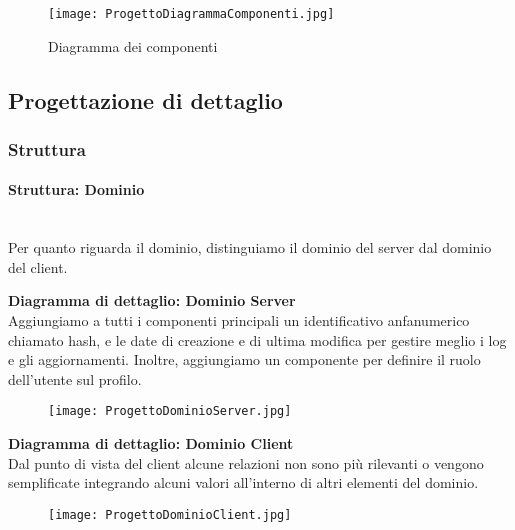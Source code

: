 \newpage

\begin{figure}[h!]
    \begin{center}
        \texttt{[image: ProgettoDiagrammaComponenti.jpg]}
        \caption{Diagramma dei componenti}
    \end{center}
\end{figure}

\newpage

\subsection{Progettazione di dettaglio}

\subsubsection{Struttura}

\paragraph{Struttura: Dominio}\mbox{}\\

Per quanto riguarda il dominio, distinguiamo il dominio del server dal dominio del client.

\vspace{1em}

\textbf{Diagramma di dettaglio: Dominio Server}\\
Aggiungiamo a tutti i componenti principali un identificativo anfanumerico chiamato hash,
e le date di creazione e di ultima modifica per gestire meglio i log e gli aggiornamenti.
Inoltre, aggiungiamo un componente per definire il ruolo dell'utente sul profilo.
\begin{figure}[h!]
    \begin{center}
        \texttt{[image: ProgettoDominioServer.jpg]}
    \end{center}
\end{figure}

\newpage

\textbf{Diagramma di dettaglio: Dominio Client}\\
Dal punto di vista del client alcune relazioni non sono più rilevanti o vengono semplificate integrando alcuni valori all'interno di altri elementi del dominio.
\begin{figure}[h!]
    \begin{center}
        \texttt{[image: ProgettoDominioClient.jpg]}
    \end{center}
\end{figure}
\clearpage
